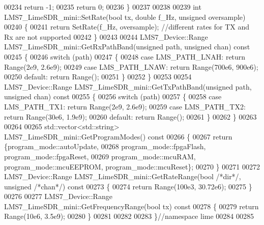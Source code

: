 \begin{DoxyCode}
00234         \textcolor{keywordflow}{return} -1;
00235      \textcolor{keywordflow}{return} 0;
00236 \}
00237 
00238 
00239 \textcolor{keywordtype}{int} LMS7_LimeSDR_mini::SetRate(\textcolor{keywordtype}{bool} tx, \textcolor{keywordtype}{double} f\_Hz, \textcolor{keywordtype}{unsigned} oversample)
00240 \{
00241     \textcolor{keywordflow}{return} SetRate(f\_Hz, oversample); \textcolor{comment}{//different rates for TX and Rx are not supported}
00242 \}
00243 
00244 LMS7_Device::Range LMS7_LimeSDR_mini::GetRxPathBand(\textcolor{keywordtype}{unsigned} path, \textcolor{keywordtype}{unsigned} chan)\textcolor{keyword}{ const}
00245 \textcolor{keyword}{}\{
00246   \textcolor{keywordflow}{switch} (path)
00247   \{
00248       \textcolor{keywordflow}{case} LMS_PATH_LNAH: \textcolor{keywordflow}{return} Range(2e9, 2.6e9);
00249       \textcolor{keywordflow}{case} LMS_PATH_LNAW: \textcolor{keywordflow}{return} Range(700e6, 900e6);
00250       \textcolor{keywordflow}{default}: \textcolor{keywordflow}{return} Range();
00251   \}
00252 \}
00253 
00254 LMS7_Device::Range LMS7_LimeSDR_mini::GetTxPathBand(\textcolor{keywordtype}{unsigned} path, \textcolor{keywordtype}{unsigned} chan)\textcolor{keyword}{ const}
00255 \textcolor{keyword}{}\{
00256   \textcolor{keywordflow}{switch} (path)
00257   \{
00258       \textcolor{keywordflow}{case} LMS_PATH_TX1: \textcolor{keywordflow}{return} Range(2e9, 2.6e9);
00259       \textcolor{keywordflow}{case} LMS_PATH_TX2: \textcolor{keywordflow}{return} Range(30e6, 1.9e9);
00260       \textcolor{keywordflow}{default}: \textcolor{keywordflow}{return} Range();
00261   \}
00262 \}
00263 
00264 
00265 std::vector<std::string> LMS7_LimeSDR_mini::GetProgramModes()\textcolor{keyword}{ const}
00266 \textcolor{keyword}{}\{
00267     \textcolor{keywordflow}{return} \{program_mode::autoUpdate,
00268             program_mode::fpgaFlash, program_mode::fpgaReset,
00269             program_mode::mcuRAM, program_mode::mcuEEPROM, 
      program_mode::mcuReset\};
00270 \}
00271 
00272 LMS7_Device::Range LMS7_LimeSDR_mini::GetRateRange(\textcolor{keywordtype}{bool} \textcolor{comment}{/*dir*/}, \textcolor{keywordtype}{unsigned} \textcolor{comment}{/*chan*/})\textcolor{keyword}{ const}
00273 \textcolor{keyword}{}\{
00274     \textcolor{keywordflow}{return} Range(100e3, 30.72e6);
00275 \}
00276 
00277 LMS7_Device::Range LMS7_LimeSDR_mini::GetFrequencyRange(\textcolor{keywordtype}{bool} tx)\textcolor{keyword}{ const}
00278 \textcolor{keyword}{}\{
00279     \textcolor{keywordflow}{return} Range(10e6, 3.5e9);
00280 \}
00281 
00282 
00283 \}\textcolor{comment}{//namespace lime}
00284 
00285 
\end{DoxyCode}
